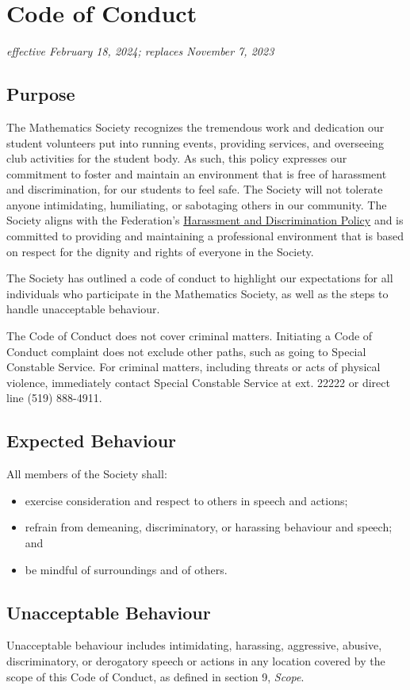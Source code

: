 \section{Code of Conduct}
\emph{effective February 18, 2024; replaces November 7, 2023}

\subsection{Purpose}
The Mathematics Society recognizes the tremendous work and dedication our student volunteers put into running events, providing services, and overseeing club activities for the student body. As such, this policy expresses our commitment to foster and maintain an environment that is free of harassment and discrimination, for our students to feel safe. The Society will not tolerate anyone intimidating, humiliating, or sabotaging others in our community. The Society aligns with the Federation's \href{https://wusa.ca/document/harassment-and-discrimination-policy/}{Harassment and Discrimination Policy} and is committed to providing and maintaining a professional environment that is based on respect for the dignity and rights of everyone in the Society.

The Society has outlined a code of conduct to highlight our expectations for all individuals who participate in the Mathematics Society, as well as the steps to handle unacceptable behaviour.

The Code of Conduct does not cover criminal matters. Initiating a Code of Conduct complaint does not exclude other paths, such as going to Special Constable Service. For criminal matters, including threats or acts of physical violence, immediately contact Special Constable Service at ext. 22222 or direct line (519) 888-4911.

\subsection{Expected Behaviour}
All members of the Society shall:
\begin{itemize}
	\item exercise consideration and respect to others in speech and actions;
	\item refrain from demeaning, discriminatory, or harassing behaviour and speech; and
	\item be mindful of surroundings and of others.
\end{itemize}

\subsection{Unacceptable Behaviour}
Unacceptable behaviour includes intimidating, harassing, aggressive, abusive, discriminatory, or derogatory speech or actions in any location covered by the scope of this Code of Conduct, as defined in section 9, \textit{Scope}.

